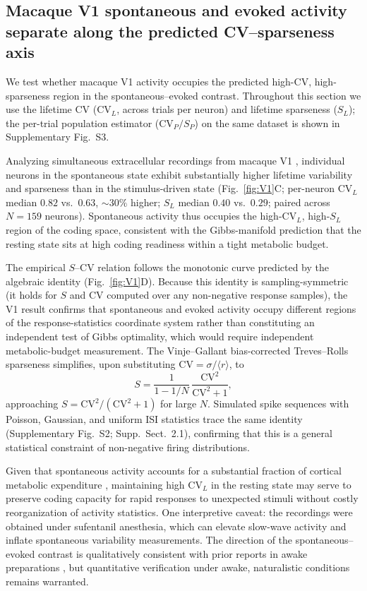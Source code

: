 \subsection{Macaque V1 spontaneous and evoked activity separate along the predicted CV--sparseness axis}
\label{sec:cv_s_data}

We test whether macaque V1 activity occupies the predicted high-CV, high-sparseness region in the spontaneous--evoked contrast.  Throughout this section we use the lifetime CV ($\mathrm{CV}_L$, across trials per neuron) and lifetime sparseness ($S_L$); the per-trial population estimator ($\mathrm{CV}_P/S_P$) on the same dataset is shown in Supplementary Fig.~S3.

Analyzing simultaneous extracellular recordings from macaque V1 \cite{23}, individual neurons in the spontaneous state exhibit substantially higher lifetime variability and sparseness than in the stimulus-driven state (Fig.~\ref{fig:V1}C; per-neuron $\mathrm{CV}_L$ median $0.82$ vs.\ $0.63$, $\sim 30\%$ higher; $S_L$ median $0.40$ vs.\ $0.29$; paired across $N=159$ neurons).  Spontaneous activity thus occupies the high-$\mathrm{CV}_L$, high-$S_L$ region of the coding space, consistent with the Gibbs-manifold prediction that the resting state sits at high coding readiness within a tight metabolic budget.

The empirical $S$--CV relation follows the monotonic curve predicted by the algebraic identity (Fig.~\ref{fig:V1}D).  Because this identity is sampling-symmetric (it holds for $S$ and CV computed over any non-negative response samples), the V1 result confirms that spontaneous and evoked activity occupy different regions of the response-statistics coordinate system rather than constituting an independent test of Gibbs optimality, which would require independent metabolic-budget measurement.  The Vinje--Gallant bias-corrected Treves--Rolls sparseness \cite{20} simplifies, upon substituting $\mathrm{CV}=\sigma/\langle r\rangle$, to
\begin{equation}
S = \frac{1}{1 - 1/N}\,\frac{\mathrm{CV}^2}{\mathrm{CV}^2 + 1},
\label{eq:S-CV-identity}
\end{equation}
approaching $S = \mathrm{CV}^2/(\mathrm{CV}^2+1)$ for large $N$.  Simulated spike sequences with Poisson, Gaussian, and uniform ISI statistics trace the same identity (Supplementary Fig.~S2; Supp.~Sect.~2.1), confirming that this is a general statistical constraint of non-negative firing distributions.

Given that spontaneous activity accounts for a substantial fraction of cortical metabolic expenditure \cite{Raichle2001,Tomasi2013}, maintaining high $\mathrm{CV}_L$ in the resting state may serve to preserve coding capacity for rapid responses to unexpected stimuli without costly reorganization of activity statistics.  One interpretive caveat: the recordings were obtained under sufentanil anesthesia, which can elevate slow-wave activity and inflate spontaneous variability measurements.  The direction of the spontaneous--evoked contrast is qualitatively consistent with prior reports in awake preparations \cite{Jia2024variability}, but quantitative verification under awake, naturalistic conditions remains warranted.

